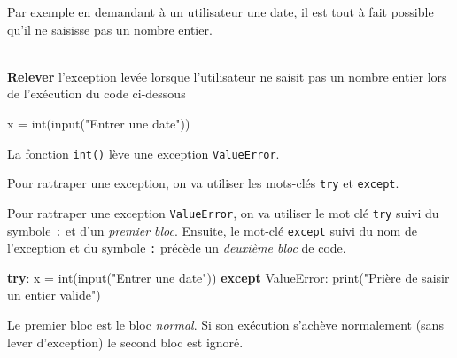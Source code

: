 \documentclass[a4paper,17pt]{extarticle}
\newenvironment{eleve}%
{\begin{activite}\color{noiramu}\\[-0.5cm]}
{\end{activite}}
\newenvironment{Shaded}{}{}
\newcommand{\StringTok}[1]{\textcolor[rgb]{0.25,0.44,0.63}{{#1}}}
\newcommand{\NormalTok}[1]{{#1}}
\newcommand{\ControlFlowTok}[1]{\textcolor[rgb]{0.00,0.44,0.13}{\textbf{{#1}}}}
\newcommand{\OperatorTok}[1]{\textcolor[rgb]{0.40,0.40,0.40}{{#1}}}
\newcommand{\BuiltInTok}[1]{{#1}}
\newcommand{\PreprocessorTok}[1]{\textcolor[rgb]{0.74,0.48,0.00}{{#1}}}
\begin{document}
Par exemple en demandant à un utilisateur une date, il est tout à fait
possible qu'il ne saisisse pas un nombre entier.
\begin{eleve}
    \textbf{Relever} l'exception levée lorsque l'utilisateur ne saisit pas
un nombre entier lors de l'exécution du code ci-dessous

\begin{Shaded}
\begin{Highlighting}[]
\NormalTok{x }\OperatorTok{=} \BuiltInTok{int}\NormalTok{(}\BuiltInTok{input}\NormalTok{(}\StringTok{"Entrer une date"}\NormalTok{))}
\end{Highlighting}
\end{Shaded}
        
        \end{eleve}\begin{reponse}
    La fonction \texttt{int()} lève une exception \texttt{ValueError}.

        \end{reponse}\begin{retenir}
    Pour rattraper une exception, on va utiliser les mots-clés \texttt{try}
et \texttt{except}.

        \end{retenir}\begin{exemple}
    Pour rattraper une exception \texttt{ValueError}, on va utiliser le mot
clé \texttt{try} suivi du symbole \texttt{:} et d'un \emph{premier
bloc}. Ensuite, le mot-clé \texttt{except} suivi du nom de l'exception
et du symbole \texttt{:} précède un \emph{deuxième bloc} de code.

\begin{Shaded}
\begin{Highlighting}[]
\ControlFlowTok{try}\NormalTok{:}
\NormalTok{    x }\OperatorTok{=} \BuiltInTok{int}\NormalTok{(}\BuiltInTok{input}\NormalTok{(}\StringTok{"Entrer une date"}\NormalTok{))}
\ControlFlowTok{except} \PreprocessorTok{ValueError}\NormalTok{:}
    \BuiltInTok{print}\NormalTok{(}\StringTok{"Prière de saisir un entier valide"}\NormalTok{)}
\end{Highlighting}
\end{Shaded}

        \end{exemple}
    Le premier bloc est le bloc \emph{normal}. Si son exécution s'achève
normalement (sans lever d'exception) le second bloc est ignoré.
\end{document}

